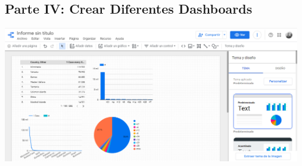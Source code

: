 \documentclass{article}
\begin{document}
    \subsection{Parte IV: Crear Diferentes Dashboards}
        \begin{center}
            \includegraphics[width=13cm]{./images/16.png}
        \end{center}


	
\end{document}
